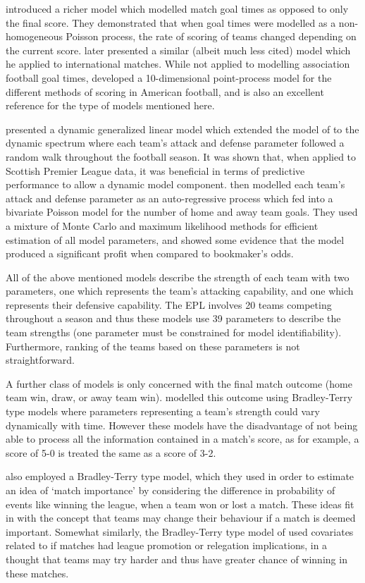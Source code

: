 \cite{DixonRobinson1998} introduced a richer model which modelled match goal times as opposed to only the final score.
They demonstrated that when goal times were modelled as a non-homogeneous Poisson process, the rate of scoring of teams
changed depending on the current score. \cite{volf2009} later presented a similar (albeit much less cited) model which
he applied to international matches. While not applied to modelling association football goal times, \cite{baker2013}
developed a 10-dimensional point-process model for the different methods of scoring in American football, and is also an
excellent reference for the type of models mentioned here. 

\cite{Owen2011} presented a dynamic generalized linear model which extended the model of \cite{Maher1982} to the dynamic
spectrum where each team's attack and defense parameter followed a random walk throughout the football season.
It was shown that, when applied to Scottish Premier League data, it was beneficial in terms of predictive performance to
allow a dynamic model component. \cite{koopman2015} then modelled each team's attack and defense parameter as an
auto-regressive process which fed into a bivariate Poisson model for the number of home and away team goals. They used a
mixture of Monte Carlo and maximum likelihood methods for efficient estimation of all model parameters, and showed some
evidence that the model produced a significant profit when compared to bookmaker's odds.

All of the above mentioned models describe the strength of each team with two parameters, one which represents the
team's attacking capability, and one which represents their defensive capability. The \gls{EPL} involves 20 teams
competing throughout a season and thus these models use 39 parameters to describe the team strengths (one parameter must
be constrained for model identifiability). Furthermore, ranking of the teams based on these parameters is not
straightforward.

A further class of models is only concerned with the final match outcome (home team win, draw, or away team win).
\cite{FahrmeirTutz1994, KnorrHeld2000, CattelanVarinFirth2013} modelled this outcome using Bradley-Terry type models
where parameters representing a team's strength could vary dynamically with time. However these models have the
disadvantage of not being able to process all the information contained in a match's score, as for example, a score of
5-0 is treated the same as a score of 3-2.

\cite{scarf2008} also employed a Bradley-Terry type model, which they used in order to estimate an idea of `match
importance' by considering the difference in probability of events like winning the league, when a team won or lost a
match. These ideas fit in with the concept that teams may change their behaviour if a match is deemed important.
Somewhat similarly, the Bradley-Terry type model of \cite{goddard2003} used covariates related to if matches had league
promotion or relegation implications, in a thought that teams may try harder and thus have greater chance of winning in
these matches.

